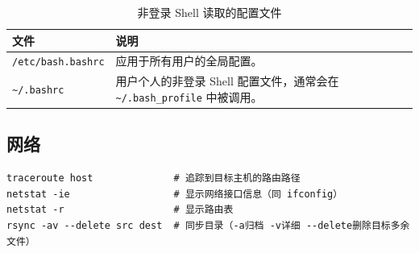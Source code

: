 \begin{table}[H]
	\centering
	\begin{tabular}{|l|p{6cm}|}
		\hline
		\textbf{文件}             & \textbf{说明}                                           \\
		\hline
		\verb|/etc/bash.bashrc| & 应用于所有用户的全局配置。                                         \\
		\hline
		\verb|~/.bashrc|        & 用户个人的非登录 Shell 配置文件，通常会在 \verb|~/.bash_profile| 中被调用。 \\
		\hline
	\end{tabular}
	\caption{非登录 Shell 读取的配置文件}
\end{table}

\subsection{网络}
\begin{code}[title=网络工具]
	\begin{verbatim}
traceroute host              # 追踪到目标主机的路由路径
netstat -ie                  # 显示网络接口信息（同 ifconfig）
netstat -r                   # 显示路由表
rsync -av --delete src dest  # 同步目录（-a归档 -v详细 --delete删除目标多余文件）
	\end{verbatim}
\end{code}
